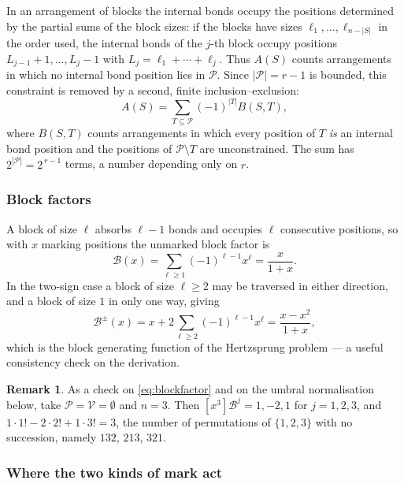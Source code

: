 \documentclass[11pt]{article}
\theoremstyle{definition}
\newtheorem{remark}[theorem]{Remark}
\begin{document}
In an arrangement of blocks the internal bonds occupy the positions determined
by the partial sums of the block sizes: if the blocks have sizes
$\ell_1,\dots,\ell_{n-|S|}$ in the order used, the internal bonds of the $j$-th
block occupy positions $L_{j-1}+1,\dots,L_j-1$ with
$L_j=\ell_1+\cdots+\ell_j$. Thus $A(S)$ counts arrangements in which no
internal bond position lies in $\mathcal P$. Since $|\mathcal P|=r-1$ is
bounded, this constraint is removed by a second, finite inclusion--exclusion:
\begin{equation}\label{eq:ie2}
  A(S)=\sum_{T\subseteq\mathcal P}(-1)^{|T|}B(S,T),
\end{equation}
where $B(S,T)$ counts arrangements in which every position of $T$ \emph{is} an
internal bond position and the positions of $\mathcal P\setminus T$ are
unconstrained. The sum has $2^{|\mathcal P|}=2^{\,r-1}$ terms, a number
depending only on $r$.

\subsubsection*{Block factors}

A block of size $\ell$ absorbs $\ell-1$ bonds and occupies $\ell$ consecutive
positions, so with $x$ marking positions the unmarked block factor is
\begin{equation}\label{eq:blockfactor}
  \mathcal B(x)=\sum_{\ell\ge1}(-1)^{\ell-1}x^{\ell}=\frac{x}{1+x}.
\end{equation}
In the two-sign case a block of size $\ell\ge2$ may be traversed in either
direction, and a block of size $1$ in only one way, giving
\begin{equation}\label{eq:blockfactorpm}
  \mathcal B^{\pm}(x)=x+2\sum_{\ell\ge2}(-1)^{\ell-1}x^{\ell}
  =\frac{x-x^{2}}{1+x},
\end{equation}
which is the block generating function of the Hertzsprung problem --- a useful
consistency check on the derivation.

\begin{remark}
As a check on \eqref{eq:blockfactor} and on the umbral normalisation below,
take $\mathcal P=\mathcal V=\emptyset$ and $n=3$. Then
$[x^{3}]\mathcal B^{j}=1,-2,1$ for $j=1,2,3$, and
$1\cdot1!-2\cdot2!+1\cdot3!=3$, the number of permutations of $\{1,2,3\}$ with
no succession, namely $132$, $213$, $321$.
\end{remark}

\subsubsection*{Where the two kinds of mark act}
\end{document}
